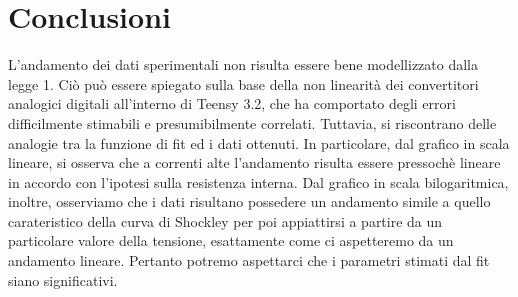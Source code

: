 \documentclass[11pt, a4paper] {article}
\begin{document}
\section{Conclusioni}
L'andamento dei dati sperimentali non risulta essere bene modellizzato dalla legge 1. Ciò può essere spiegato sulla base della non linearità dei convertitori analogici digitali all'interno di Teensy 3.2, che ha comportato degli errori difficilmente stimabili e presumibilmente correlati. Tuttavia, si riscontrano delle analogie tra la funzione di fit ed i dati ottenuti. In particolare, dal grafico in scala lineare, si osserva che a correnti alte l'andamento risulta essere pressochè lineare in accordo con l'ipotesi sulla resistenza interna. Dal grafico in scala bilogaritmica, inoltre, osserviamo che i dati risultano possedere un andamento simile a quello carateristico della curva di Shockley per poi appiattirsi a partire da un particolare valore della tensione, esattamente come ci aspetteremo da un andamento lineare. Pertanto potremo aspettarci che i parametri stimati dal fit siano significativi.
\end{document}
